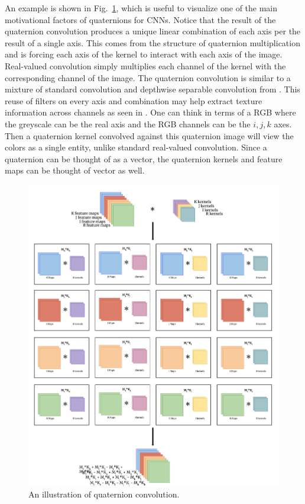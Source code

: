 An example is shown in Fig.~\ref{f:quatconv}, which is useful to visualize one of the main motivational factors of quaternions for CNNs.
Notice that the result of the quaternion convolution produces a unique linear combination of each axis per the result of a single axis.
This comes from the structure of quaternion multiplication and is forcing each axis of the kernel to interact with each axis of the image.
Real-valued convolution simply multiplies each channel of the kernel with the corresponding channel of the image.
The quaternion convolution is similar to a mixture of standard convolution and depthwise separable convolution from \cite{chollet2016xception}. 
This reuse of filters on every axis and combination may help extract texture information across channels as seen in \cite{shi2007quaternion}.
One can think in terms of a RGB where the greyscale can be the real axis and the RGB channels can be the $i, j, k$ axes.
Then a quaternion kernel convolved against this quaternion image will view the colors as a single entity, unlike standard real-valued convolution.
Since a quaternion can be thought of as a vector, the quaternion kernels and feature maps can be thought of vector as well.

\begin{figure}
	\centering
		\includegraphics[width=1.0\textwidth]{figures/quatconv.png}
	\caption{An illustration of quaternion convolution.}
	\label{f:quatconv}
\end{figure}



